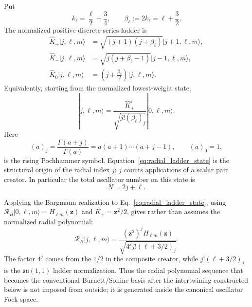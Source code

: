 \documentclass[11pt]{article}
\numberwithin{equation}{section}
\theoremstyle{definition}
\begin{document}
Put
\begin{equation}
 k_\ell=\frac\ell2+\frac34,
 \qquad
 \beta_\ell:=2k_\ell=\ell+\frac32.
 \label{eq:k_beta}
\end{equation}
The normalized positive-discrete-series ladder is
\begin{align}
 \widehat K_+|j,\ell,m\rangle
 &=\sqrt{(j+1)(j+\beta_\ell)}
 |j+1,\ell,m\rangle,
 \label{eq:Kplus_ladder}
 \\
 \widehat K_-|j,\ell,m\rangle
 &=\sqrt{j(j+\beta_\ell-1)}
 |j-1,\ell,m\rangle,
 \label{eq:Kminus_ladder}
 \\
 \widehat K_0|j,\ell,m\rangle
 &=\left(j+\frac{\beta_\ell}{2}\right)|j,\ell,m\rangle.
 \label{eq:K0_ladder}
\end{align}
Equivalently, starting from the normalized lowest-weight state,
\begin{equation}
 |j,\ell,m\rangle
 =
 \frac{\widehat K_+^j}{\sqrt{j!(\beta_\ell)_j}}
 |0,\ell,m\rangle .
 \label{eq:radial_ladder_state}
\end{equation}
Here
\begin{equation}
 (a)_j
 =
 \frac{\Gamma(a+j)}{\Gamma(a)}
 =a(a+1)\cdots(a+j-1),
 \qquad
 (a)_0=1,
 \label{eq:pochhammer_def}
\end{equation}
is the rising Pochhammer symbol.  Equation~\eqref{eq:radial_ladder_state} is
the structural origin of the radial index $j$: $j$ counts applications of a
scalar pair creator.  In particular the total oscillator number on this state
is
\begin{equation}
 N=2j+\ell.
 \label{eq:N_2jell}
\end{equation}

Applying the Bargmann realization to
Eq.~\eqref{eq:radial_ladder_state}, using
$\mathcal R_B|0,\ell,m\rangle=H_{\ell m}(\bm z)$ and
$K_+=\bm z^2/2$, gives rather than assumes the normalized radial polynomial:
\begin{equation}
 \mathcal R_B|j,\ell,m\rangle
 =
 \frac{(\bm z^2)^jH_{\ell m}(\bm z)}
 {\sqrt{4^j j!(\ell+3/2)_j}}.
 \label{eq:normalized_state}
\end{equation}
The factor $4^j$ comes from the $1/2$ in the composite creator, while
$j!(\ell+3/2)_j$ is the $\mathfrak{su}(1,1)$ ladder normalization.  Thus the radial polynomial sequence that becomes the conventional
Burnett/Sonine basis after the intertwining constructed below
\cite{ChapmanCowling1970,Kumar1966} is not imposed from outside; it is generated
inside the canonical oscillator Fock space.
\end{document}
